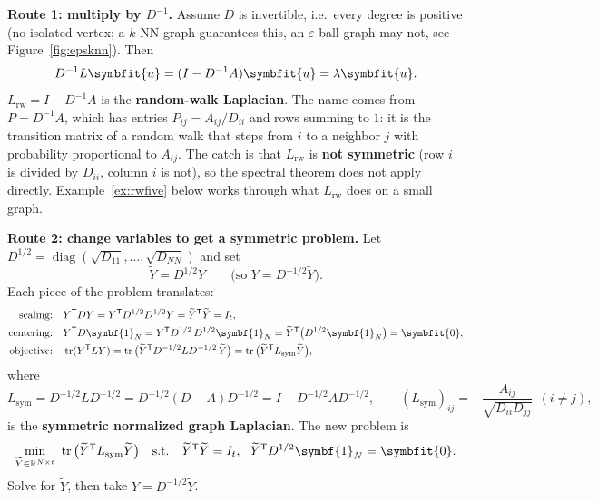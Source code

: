 \documentclass[11pt]{article}
\newcommand{\bm}[1]{\symbfit{#1}}
\newcommand{\R}{\mathbb{R}}
\newcommand{\vu}{\bm{u}}
\newcommand{\one}{\symbf{1}}
\newcommand{\T}{^{\mathsf T}}
\newcommand{\tr}{\operatorname{tr}}
\newcommand{\diag}{\operatorname{diag}}
\begin{document}
\textbf{Route 1: multiply by $D^{-1}$.} Assume $D$ is invertible, i.e.\ every degree is positive (no isolated vertex; a $k$-NN graph guarantees this,
an $\varepsilon$-ball graph may not, see Figure~\ref{fig:epsknn}). Then
\[
D^{-1}L\vu=(I-D^{-1}A)\vu=\lambda\vu .
\]
$L_{\mathrm{rw}}=I-D^{-1}A$ is the \textbf{random-walk Laplacian}. The name comes from $P=D^{-1}A$, which has entries $P_{ij}=A_{ij}/D_{ii}$ and rows summing to
$1$: it is the transition matrix of a random walk that steps from $i$ to a neighbor $j$ with probability proportional to $A_{ij}$. The catch is
that $L_{\mathrm{rw}}$ is \textbf{not symmetric} (row $i$ is divided by $D_{ii}$, column $i$ is not), so the spectral theorem does not apply directly. Example~\ref{ex:rwfive} below works through what $L_{\mathrm{rw}}$ does on a small graph.

\textbf{Route 2: change variables to get a symmetric problem.} Let $D^{1/2}=\diag(\sqrt{D_{11}},\dots,\sqrt{D_{NN}})$ and set
\[
\widetilde Y=D^{1/2}Y\qquad\big(\text{so } Y=D^{-1/2}\widetilde Y\big).
\]
Each piece of the problem translates:
\begin{align*}
\text{scaling:}\quad & Y\T DY=Y\T D^{1/2}D^{1/2}Y=\widetilde Y\T\widetilde Y=I_t,\\
\text{centering:}\quad & Y\T D\one_N=Y\T D^{1/2}\,D^{1/2}\one_N=\widetilde Y\T\big(D^{1/2}\one_N\big)=\bm0,\\
\text{objective:}\quad & \tr(Y\T LY)=\tr\big(\widetilde Y\T D^{-1/2}LD^{-1/2}\,\widetilde Y\big)=\tr\big(\widetilde Y\T L_{\mathrm{sym}}\widetilde Y\big),
\end{align*}
where
\[
L_{\mathrm{sym}}=D^{-1/2}LD^{-1/2}=D^{-1/2}(D-A)D^{-1/2}=I-D^{-1/2}AD^{-1/2},\qquad (L_{\mathrm{sym}})_{ij}=-\frac{A_{ij}}{\sqrt{D_{ii}D_{jj}}}\ \ (i\ne j),
\]
is the \textbf{symmetric normalized graph Laplacian}. The new problem is
\[
\min_{\widetilde Y\in\R^{N\times t}}\ \tr\big(\widetilde Y\T L_{\mathrm{sym}}\widetilde Y\big)\quad\text{s.t.}\quad \widetilde Y\T\widetilde Y=I_t,\ \ \widetilde Y\T D^{1/2}\one_N=\bm0 .
\]
Solve for $\widetilde Y$, then take $Y=D^{-1/2}\widetilde Y$.
\end{document}
